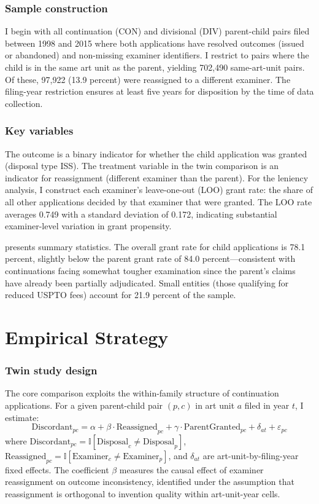 \documentclass[12pt]{article}
\newcommand{\ind}{\mathbb{I}}
\begin{document}
\subsubsection*{Sample construction} I begin with all continuation (CON) and divisional (DIV) parent-child pairs filed between 1998 and 2015 where both applications have resolved outcomes (issued or abandoned) and non-missing examiner identifiers. I restrict to pairs where the child is in the same art unit as the parent, yielding 702,490 same-art-unit pairs. Of these, 97,922 (13.9 percent) were reassigned to a different examiner. The filing-year restriction ensures at least five years for disposition by the time of data collection.

\subsubsection*{Key variables} The outcome is a binary indicator for whether the child application was granted (disposal type ISS). The treatment variable in the twin comparison is an indicator for reassignment (different examiner than the parent). For the leniency analysis, I construct each examiner's leave-one-out (LOO) grant rate: the share of all other applications decided by that examiner that were granted. The LOO rate averages 0.749 with a standard deviation of 0.172, indicating substantial examiner-level variation in grant propensity.

 presents summary statistics. The overall grant rate for child applications is 78.1 percent, slightly below the parent grant rate of 84.0 percent---consistent with continuations facing somewhat tougher examination since the parent's claims have already been partially adjudicated. Small entities (those qualifying for reduced USPTO fees) account for 21.9 percent of the sample.




\section{Empirical Strategy}
\label{sec:strategy}

\subsubsection*{Twin study design} The core comparison exploits the within-family structure of continuation applications. For a given parent-child pair $(p, c)$ in art unit $a$ filed in year $t$, I estimate:
\begin{equation}
\text{Discordant}_{pc} = \alpha + \beta \cdot \text{Reassigned}_{pc} + \gamma \cdot \text{ParentGranted}_{pc} + \delta_{at} + \varepsilon_{pc}
\label{eq:discord}
\end{equation}
where $\text{Discordant}_{pc} = \ind[\text{Disposal}_c \neq \text{Disposal}_p]$, $\text{Reassigned}_{pc} = \ind[\text{Examiner}_c \neq \text{Examiner}_p]$, and $\delta_{at}$ are art-unit-by-filing-year fixed effects. The coefficient $\beta$ measures the causal effect of examiner reassignment on outcome inconsistency, identified under the assumption that reassignment is orthogonal to invention quality within art-unit-year cells.
\end{document}
